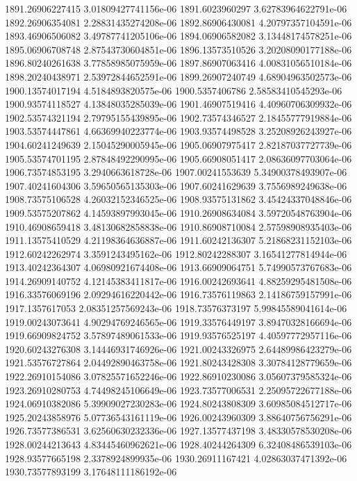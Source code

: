 {1891.26906227415 3.01809427741156e-06
1891.6023960297 3.62783964622791e-06
1892.26906354081 2.28831435274208e-06
1892.86906430081 4.20797357104591e-06
1893.46906506082 3.49787741205106e-06
1894.06906582082 3.13448174578251e-06
1895.06906708748 2.87543730604851e-06
1896.13573510526 3.20208090177188e-06
1896.80240261638 3.77858985075959e-06
1897.86907063416 4.00831056510184e-06
1898.20240438971 2.53972844652591e-06
1899.26907240749 4.68904963502573e-06
1900.13574017194 4.5184893820575e-06
1900.5357406786 2.58583410545293e-06
1900.93574118527 4.13848035285039e-06
1901.46907519416 4.40960706309932e-06
1902.53574321194 2.79795155439895e-06
1902.73574346527 2.18455777919884e-06
1903.53574447861 4.66369940223774e-06
1903.93574498528 3.25208926243927e-06
1904.60241249639 2.15045290005945e-06
1905.06907975417 2.82187037727739e-06
1905.53574701195 2.87848492290995e-06
1905.66908051417 2.08636097703064e-06
1906.73574853195 3.2940663618728e-06
1907.00241553639 5.34900378493907e-06
1907.40241604306 3.59650565135303e-06
1907.60241629639 3.7556989249638e-06
1908.73575106528 4.26032152346525e-06
1908.93575131862 3.45424337048846e-06
1909.53575207862 4.14593897993045e-06
1910.26908634084 3.59720548763904e-06
1910.46908659418 3.48130682858838e-06
1910.86908710084 2.57598908935403e-06
1911.13575410529 4.21198364636887e-06
1911.60242136307 5.21868231152103e-06
1912.60242262974 3.3591243495162e-06
1912.80242288307 3.16541277814944e-06
1913.40242364307 4.06980921674408e-06
1913.66909064751 5.74990573767683e-06
1914.26909140752 4.12145383411817e-06
1916.00242693641 4.88259295481508e-06
1916.33576069196 2.09294616220442e-06
1916.73576119863 2.14186759157991e-06
1917.1357617053 2.08351257569243e-06
1918.73576373197 5.99845589041614e-06
1919.00243073641 4.90294769246565e-06
1919.33576449197 3.89470328166694e-06
1919.66909824752 3.57897489061533e-06
1919.93576525197 4.40597772957116e-06
1920.60243276308 3.14446931746926e-06
1921.00243326975 2.64489986423279e-06
1921.53576727864 2.04492890463758e-06
1921.80243428308 3.30784128779659e-06
1922.26910154086 3.07825571652246e-06
1922.86910230086 3.05607379585324e-06
1923.26910280753 4.74498245106649e-06
1923.73577006531 2.25095722677188e-06
1924.06910382086 5.39909027230283e-06
1924.80243808309 3.60985084512717e-06
1925.20243858976 5.07736543161119e-06
1926.00243960309 3.88640756756291e-06
1926.73577386531 3.62560630232336e-06
1927.13577437198 3.48330578530208e-06
1928.00244213643 4.83445460962621e-06
1928.40244264309 6.32408486539103e-06
1928.93577665198 2.3378924899935e-06
1930.26911167421 4.02863037471392e-06
1930.73577893199 3.17648111186192e-06
}
